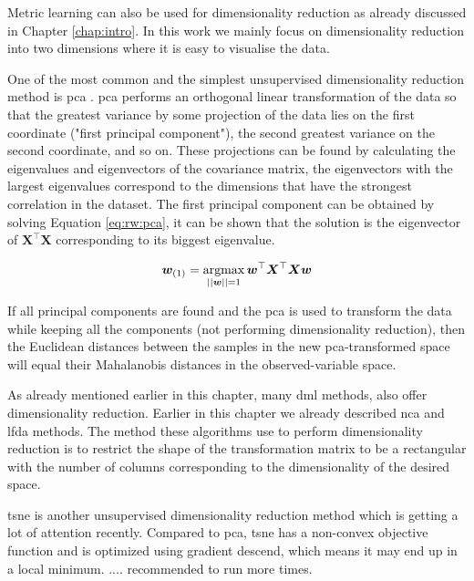 \documentclass[12pt,a4paper]{report}
\begin{document}
Metric learning can also be used for dimensionality reduction as already discussed in Chapter \ref{chap:intro}. In this work we mainly focus on dimensionality reduction into two dimensions where it is easy to visualise the data.

One of the most common and the simplest unsupervised dimensionality reduction method is \ac{pca} \citep{jolliffe2002principal}. \ac{pca} performs an orthogonal linear transformation of the data so that the greatest variance by some projection of the data lies on the first coordinate ("first principal component"), the second greatest variance on the second coordinate, and so on. These projections can be found by calculating the eigenvalues and eigenvectors of the covariance matrix, the eigenvectors with the largest eigenvalues correspond to the dimensions that have the strongest correlation in the dataset. The first principal component can be obtained by solving Equation \ref{eq:rw:pca}, it can be shown that the solution is the eigenvector of $\bm{X}^\top\bm{X}$ corresponding to its biggest eigenvalue.

\begin{equation} 
\bm{w}_{(1)} = \operatorname*{argmax}_{||\bm{w}||=1} \bm{w}^\top\bm{X}^\top\bm{X}\bm{w} \label{eq:rw:pca}
\end{equation}

If all principal components are found and the \ac{pca} is used to transform the data while keeping all the components (not performing dimensionality reduction), then the Euclidean distances between the samples in the new \ac{pca}-transformed space will equal their Mahalanobis distances in the observed-variable space.


As already mentioned earlier in this chapter, many \acl{dml} methods, also offer dimensionality reduction. Earlier in this chapter we already described \ac{nca} and \ac{lfda} methods. The method these algorithms use to perform dimensionality reduction is to restrict the shape of the transformation matrix to be a rectangular with the number of columns corresponding to the dimensionality of the desired space.


\ac{tsne} \citep{maaten2008visualizing} is another unsupervised dimensionality reduction method which is getting a lot of attention recently. Compared to \ac{pca}, \ac{tsne} has a non-convex objective function and is optimized using gradient descend, which means it may end up in a local minimum. .... recommended to run more times.
\end{document}
